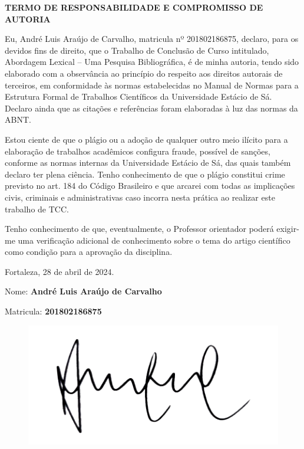 \newpage

\centerline{\bfseries{TERMO DE RESPONSABILIDADE E COMPROMISSO DE AUTORIA}}

\vspace{36pt}

Eu, André Luis Araújo de Carvalho, matricula nº  201802186875, declaro, para os devidos fins de direito, que o Trabalho de Conclusão de Curso intitulado, Abordagem Lexical – Uma Pesquisa Bibliográfica­, é de minha autoria, tendo sido elaborado com a observância ao princípio do respeito aos direitos autorais de terceiros, em conformidade às normas estabelecidas no Manual de Normas para a Estrutura Formal de Trabalhos Científicos da Universidade Estácio de Sá. Declaro ainda que as citações e referências foram elaboradas à luz das normas da ABNT.

Estou ciente de que o plágio ou a adoção de qualquer outro meio ilícito para a elaboração de trabalhos acadêmicos configura fraude, possível de sanções, conforme as normas internas da Universidade Estácio de Sá, das quais também declaro ter plena ciência. Tenho conhecimento de que o plágio constitui crime previsto no art. 184 do Código Brasileiro e que arcarei com todas as implicações civis, criminais e administrativas caso incorra nesta prática ao realizar este trabalho de TCC.

Tenho conhecimento de que, eventualmente, o Professor orientador poderá exigir-me uma verificação adicional de conhecimento sobre o tema do artigo científico como condição para a aprovação da disciplina.

\vspace{12pt}

\begin{flushright}
    Fortaleza, 28 de abril de 2024.
\end{flushright}

Nome: \textbf{André Luis Araújo de Carvalho}

Matricula: \textbf{201802186875}

\begin{figure}[h]
    \centering
    \includegraphics{assinatura_andre.png}
\end{figure}
